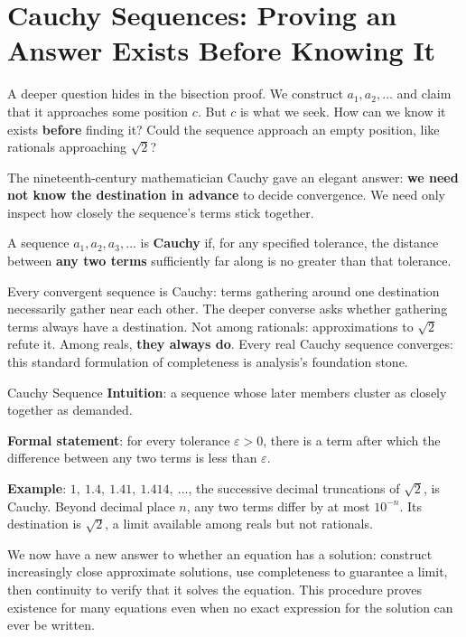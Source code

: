 \section{Cauchy Sequences: Proving an Answer Exists Before Knowing It}

A deeper question hides in the bisection proof. We construct $a_1,a_2,\dots$ and claim that it approaches some position $c$. But $c$ is what we seek. How can we know it exists \textbf{before} finding it? Could the sequence approach an empty position, like rationals approaching $\sqrt{2}$?

The nineteenth-century mathematician Cauchy gave an elegant answer: \textbf{we need not know the destination in advance} to decide convergence. We need only inspect how closely the sequence's terms stick together.

\begin{dingyi}
A sequence $a_1,a_2,a_3,\dots$ is \textbf{Cauchy} if, for any specified tolerance, the distance between \textbf{any two terms} sufficiently far along is no greater than that tolerance.
\end{dingyi}

Every convergent sequence is Cauchy: terms gathering around one destination necessarily gather near each other. The deeper converse asks whether gathering terms always have a destination. Not among rationals: approximations to $\sqrt{2}$ refute it. Among reals, \textbf{they always do}. Every real Cauchy sequence converges: this standard formulation of completeness is analysis's foundation stone.

\begin{shuyu}{Cauchy Sequence}
\textbf{Intuition}: a sequence whose later members cluster as closely together as demanded.

\textbf{Formal statement}: for every tolerance $\varepsilon>0$, there is a term after which the difference between any two terms is less than $\varepsilon$.

\textbf{Example}: $1,\ 1.4,\ 1.41,\ 1.414,\ \dots$, the successive decimal truncations of $\sqrt{2}$, is Cauchy. Beyond decimal place $n$, any two terms differ by at most $10^{-n}$. Its destination is $\sqrt{2}$, a limit available among reals but not rationals.
\end{shuyu}

We now have a new answer to whether an equation has a solution: construct increasingly close approximate solutions, use completeness to guarantee a limit, then continuity to verify that it solves the equation. This procedure proves existence for many equations even when no exact expression for the solution can ever be written.

